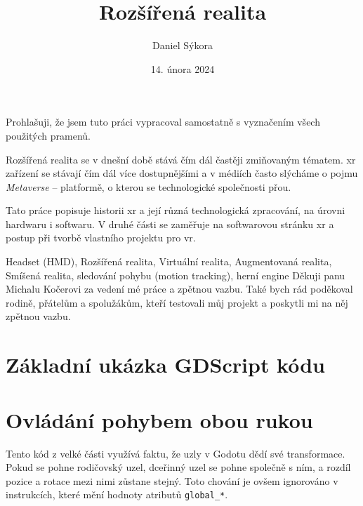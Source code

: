 \documentclass[12pt]{report}
\author{Daniel Sýkora}
\title{Rozšířená realita}
\date{14. února 2024}
\begin{document}
\mytitlepage
\prohlaseni
{
	Prohlašuji, že jsem tuto práci vypracoval samostatně s vyznačením všech použitých pramenů.
}
\abstrakt
{ %
	Rozšířená realita se v dnešní době stává čím dál častěji zmiňovaným tématem. \gls{xr} zařízení se stávají čím dál více dostupnějšími a v médiích často slýcháme o pojmu \textit{Metaverse} -- platformě, o kterou se technologické společnosti přou.

	Tato práce popisuje historii \gls{xr} a její různá technologická zpracování, na úrovni hardwaru i softwaru. V druhé části se zaměřuje na softwarovou stránku \gls{xr} a postup při tvorbě vlastního projektu pro \gls{vr}.
}
{ %
	Headset (HMD), Rozšířená realita, Virtuální realita, Augmentovaná realita, Smíšená realita, sledování pohybu (motion tracking), herní engine
}
\podekovani
{
	Děkuji panu Michalu Kočerovi za vedení mé práce a zpětnou vazbu. Také bych rád poděkoval rodině, přátelům a spolužákům, kteří testovali můj projekt a poskytli mi na něj zpětnou vazbu.
}

\tableofcontents
\newpage






\nocite{*}

\printbibliography

\printglossary[title={Zkratky}]

\listoffigures
{}

\appendix

\chapter{Základní ukázka GDScript kódu}\label{apx_gscript_sample}


\chapter{Ovládání pohybem obou rukou}\label{apx_gripped_object_transformation}
Tento kód z velké části využívá faktu, že uzly v Godotu dědí své transformace. Pokud se pohne rodičovský uzel, dceřinný uzel se pohne společně s ním, a rozdíl pozice a rotace mezi nimi zůstane stejný. Toto chování je ovšem ignorováno v instrukcích, které mění hodnoty atributů \texttt{global\_*}.
\end{document}
